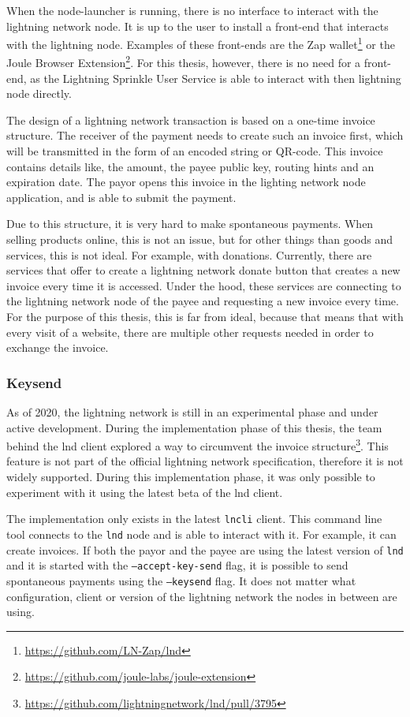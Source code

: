 When the node-launcher is running, there is no interface to interact with the lightning network node. It is up to the user to install a front-end that interacts with the lightning node. Examples of these front-ends are the Zap wallet\footnote{\url{https://github.com/LN-Zap/lnd}} or the Joule Browser Extension\footnote{\url{https://github.com/joule-labs/joule-extension}}. For this thesis, however, there is no need for a front-end, as the Lightning Sprinkle User Service is able to interact with then lightning node directly. 

The design of a lightning network transaction is based on a one-time invoice structure. The receiver of the payment needs to create such an invoice first, which will be transmitted in the form of an encoded string or QR-code. This invoice contains details like, the amount, the payee public key, routing hints and an expiration date. The payor opens this invoice in the lighting network node application, and is able to submit the payment.

Due to this structure, it is very hard to make spontaneous payments. When selling products online, this is not an issue, but for other things than goods and services, this is not ideal. For example, with donations. Currently, there are services that offer to create a lightning network donate button that creates a new invoice every time it is accessed. Under the hood, these services are connecting to the lightning network node of the payee and requesting a new invoice every time. For the purpose of this thesis, this is far from ideal, because that means that with every visit of a website, there are multiple other requests needed in order to exchange the invoice. 

\subsubsection{Keysend}
\label{sec:keysend}

As of 2020, the lightning network is still in an experimental phase and under active development. During the implementation phase of this thesis, the team behind the lnd client explored a way to circumvent the invoice structure\footnote{\url{https://github.com/lightningnetwork/lnd/pull/3795}}. This feature is not part of the official lightning network specification, therefore it is not widely supported. During this implementation phase, it was only possible to experiment with it using the latest beta of the lnd client. 

The implementation only exists in the latest \texttt{lncli} client. This command line tool connects to the \texttt{lnd} node and is able to interact with it. For example, it can create invoices. If both the payor and the payee are using the latest version of \texttt{lnd} and it is started with the \texttt{--accept-key-send} flag, it is possible to send spontaneous payments using the \texttt{--keysend} flag. It does not matter what configuration, client or version of the lightning network the nodes in between are using. 

